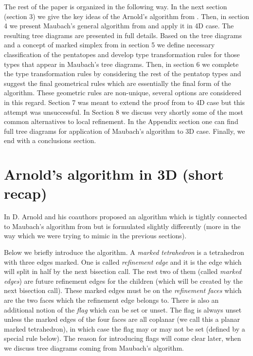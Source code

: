 \documentclass[a4paper,12pt]{amsart}
\numberwithin{equation}{section}
\begin{document}
The rest of the paper is organized in the following way.
In the next section (section 3) we give the key ideas of the Arnold's algorithm from \cite{arnold}.
Then, in section 4 we present Maubach's general algorithm from \cite{maubach} and apply it in 4D case. The resulting tree diagrams are presented in full details. Based on the tree diagrams and a concept of marked simplex from \cite{arnold} in section 5 we define necessary classification of the pentatopes and develop type transformation rules for those types that appear in Maubach's tree diagrams.
Then, in section 6 we complete the type transformation rules by considering the rest of the pentatop types and suggest the final geometrical rules which are essentially the final form of the algorithm. These geometric rules are non-unique, several options are considered in this regard.
Section 7 was meant to extend the proof from \cite{arnold} to 4D case but this attempt was unsuccessful. In Section 8 we discuss very shortly some of the most common alternatives to local refinement.
In the Appendix section one can find full tree diagrams for application of Maubach's algorithm to 3D case.
Finally, we end with a conclusions section.


\section{Arnold's algorithm in 3D (short recap)}

In \cite{arnold} D. Arnold and his coauthors proposed an algorithm which is tightly connected to Maubach's algorithm from \cite{maubach} but is formulated slightly differently (more in the way which we were trying to mimic in the previous sections).

Below we briefly introduce the algorithm. 
A \textit{marked tetrahedron} is a tetrahedron with three edges marked. One is called \textit{refinement edge} and it is the edge which will split in half by the next bisection call. The rest two of them (called \textit{marked edges}) are future refinement edges for the children (which will be created by the next bisection call). These marked edges must be on the \textit{refinement faces} which are the two faces which the refinement edge belongs to. There is also an additional notion of the \textit{flag} which can be set or unset. The flag is always unset unless the marked edges of the
four faces are all coplanar (we call this a planar marked tetrahedron), in which case
the flag may or may not be set (defined by a special rule below). The reason for introducing flags will come clear later, when we discuss tree diagrams coming from Maubach's algorithm.
\end{document}
